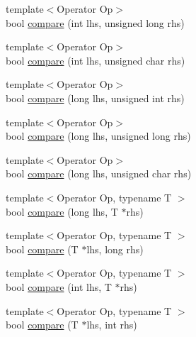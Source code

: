 \begin{DoxyCompactItemize}
\item 
{\footnotesize template$<$Operator Op$>$ }\\bool \hyperlink{namespaceCatch_1_1Internal_aac7a6452ed0d324031ceb7b4f3a3b61c}{compare} (int lhs, unsigned long rhs)
\item 
{\footnotesize template$<$Operator Op$>$ }\\bool \hyperlink{namespaceCatch_1_1Internal_a7e82d987f62b9822107027c72a55fa6b}{compare} (int lhs, unsigned char rhs)
\item 
{\footnotesize template$<$Operator Op$>$ }\\bool \hyperlink{namespaceCatch_1_1Internal_a0b4783ede1901e5c1baf8ff909bcce8d}{compare} (long lhs, unsigned int rhs)
\item 
{\footnotesize template$<$Operator Op$>$ }\\bool \hyperlink{namespaceCatch_1_1Internal_ae9aec44a08d9cbb0d3dd46d438b50d2c}{compare} (long lhs, unsigned long rhs)
\item 
{\footnotesize template$<$Operator Op$>$ }\\bool \hyperlink{namespaceCatch_1_1Internal_a79664b5f5f497fba57bd156e098de1f2}{compare} (long lhs, unsigned char rhs)
\item 
{\footnotesize template$<$Operator Op, typename T $>$ }\\bool \hyperlink{namespaceCatch_1_1Internal_a829570ad9e724c687aa42190a696032b}{compare} (long lhs, T $\ast$rhs)
\item 
{\footnotesize template$<$Operator Op, typename T $>$ }\\bool \hyperlink{namespaceCatch_1_1Internal_a3f89c65fdb06aa7b648c5acf0ca107a9}{compare} (T $\ast$lhs, long rhs)
\item 
{\footnotesize template$<$Operator Op, typename T $>$ }\\bool \hyperlink{namespaceCatch_1_1Internal_a4f30c29e4adb62c7e209e5b988e59397}{compare} (int lhs, T $\ast$rhs)
\item 
{\footnotesize template$<$Operator Op, typename T $>$ }\\bool \hyperlink{namespaceCatch_1_1Internal_a95361ddae55c9a390e6510bdadccb1fc}{compare} (T $\ast$lhs, int rhs)
\end{DoxyCompactItemize}


